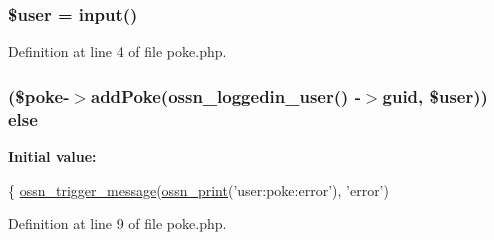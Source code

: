\subsubsection[{\texorpdfstring{\$user}{$user}}]{\setlength{\rightskip}{0pt plus 5cm}\${\bf user} = {\bf input}(\textquotesingle{})}\hypertarget{actions_2user_2poke_8php_a598ca4e71b15a1313ec95f0df1027ca5}{}\label{actions_2user_2poke_8php_a598ca4e71b15a1313ec95f0df1027ca5}


Definition at line 4 of file poke.\+php.

\subsubsection[{\texorpdfstring{else}{else}}]{ (\$poke-\/$>$add\+Poke({\bf ossn\+\_\+loggedin\+\_\+user}() -\/$>$guid, \${\bf user})) else}\hypertarget{actions_2user_2poke_8php_ad80dd63870ef9c842193e474f23caf1f}{}\label{actions_2user_2poke_8php_ad80dd63870ef9c842193e474f23caf1f}
{\bfseries Initial value\+:}
\begin{DoxyCode}
\{
    \hyperlink{ossn_8lib_8system_8php_ab3f23f23f32f50c12e7aea0ffaccaac7}{ossn\_trigger\_message}(\hyperlink{ossn_8lib_8languages_8php_a2be5d1c4b695593a9b9067b96df2150a}{ossn\_print}(\textcolor{stringliteral}{'user:poke:error'}), \textcolor{stringliteral}{'error'})
\end{DoxyCode}


Definition at line 9 of file poke.\+php.

